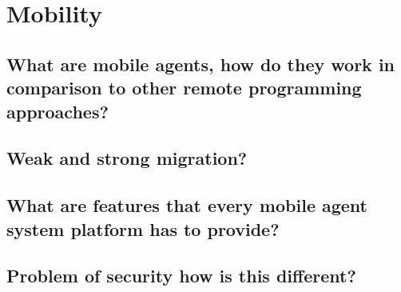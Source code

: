 \section{Mobility}
\subsection{What are mobile agents, how do they work in comparison to other remote programming approaches?}
\subsection{Weak and strong migration?}
\subsection{What are features that every mobile agent system platform has to provide?}
\subsection{Problem of security how is this different?}
